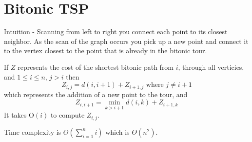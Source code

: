 \documentclass[12pt,twoside,letterpaper]{article}
\begin{document}
\section*{Bitonic TSP}
Intuition - Scanning from left to right you connect each point to its closest neighbor. As the scan of the graph occurs you pick up a new point and connect it to the vertex closest to the point that is already in the bitonic tour.

If $Z$ represents the cost of the shortest bitonic path from $i$, through all verticies, and $1 \le i \le n$, $j > i$ then
$$Z_{i,j} = d(i,i+1) + Z_{i+1,j} \textrm{ where } j \ne i+1$$
which represents the addition of a new point to the tour, and
$$Z_{i,i+1} = \min_{k>i+1}{ d(i,k) + Z_{i+1,k}} $$
It takes $\textrm{O}(i)$ to compute $Z_{i,j}$. 

Time complexity is $\Theta(\sum_{i=1}^n i)$ which is $\Theta(n^2)$.
\end{document}
